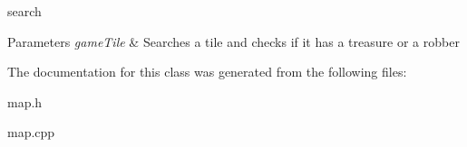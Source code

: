 search 


\begin{DoxyParams}{Parameters}
{\em game\-Tile} & Searches a tile and checks if it has a treasure or a robber \\
\hline
\end{DoxyParams}


The documentation for this class was generated from the following files\-:\begin{DoxyCompactItemize}
\item 
map.\-h\item 
map.\-cpp\end{DoxyCompactItemize}
